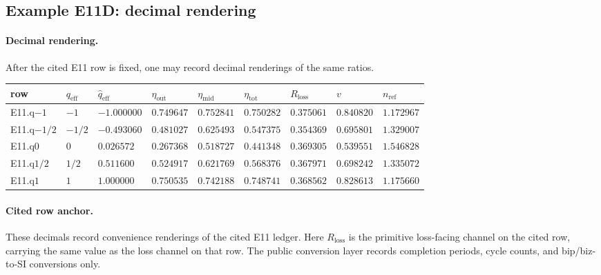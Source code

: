 \subsection{Example E11D: decimal rendering}\label{app:e11-dict}
\paragraph{Decimal rendering.} After the cited E11 row is fixed, one may record decimal renderings of the same ratios.
{\footnotesize
\begin{center}
\begin{tabular}{@{}lllllllll@{}}
\toprule
row & $q_{\mathrm{eff}}$ & $\widehat q_{\mathrm{eff}}$ & $\eta_{\mathrm{out}}$ & $\eta_{\mathrm{mid}}$ & $\eta_{\mathrm{tot}}$ & $R_{\mathrm{loss}}$ & $v$ & $n_{\mathrm{ref}}$ \\
\midrule
E11.q$-1$ & $-1$ & $-1.000000$ & $0.749647$ & $0.752841$ & $0.750282$ & $0.375061$ & $0.840820$ & $1.172967$ \\
E11.q$-1/2$ & $-1/2$ & $-0.493060$ & $0.481027$ & $0.625493$ & $0.547375$ & $0.354369$ & $0.695801$ & $1.329007$ \\
E11.q$0$ & $0$ & $0.026572$ & $0.267368$ & $0.518727$ & $0.441348$ & $0.369305$ & $0.539551$ & $1.546828$ \\
E11.q$1/2$ & $1/2$ & $0.511600$ & $0.524917$ & $0.621769$ & $0.568376$ & $0.367971$ & $0.698242$ & $1.335072$ \\
E11.q$1$ & $1$ & $1.000000$ & $0.750535$ & $0.742188$ & $0.748741$ & $0.368562$ & $0.828613$ & $1.175660$ \\
\bottomrule
\end{tabular}
\end{center}}
\paragraph{Cited row anchor.} These decimals record convenience renderings of the cited E11 ledger. Here $R_{\mathrm{loss}}$ is the primitive loss-facing channel on the cited row, carrying the same value as the loss channel on that row. The public conversion layer records completion periods, cycle counts, and bip/biz-to-SI conversions only.
